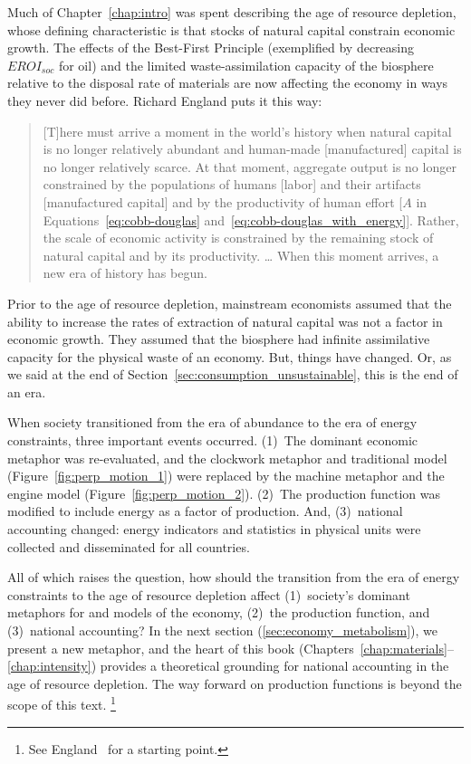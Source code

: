 Much of Chapter~\ref{chap:intro} was spent
describing the age of resource depletion,
whose defining characteristic
is that stocks of natural capital constrain economic growth.
The effects of the Best-First Principle (exemplified by decreasing $EROI_{soc}$ for oil)
and the limited waste-assimilation capacity of the biosphere
relative to the disposal rate of materials
are now affecting the economy in ways they never did before.
Richard England puts it this way:
%
\begin{quote}
	[T]here must arrive a moment in the world's history 
	when natural capital is no longer relatively abundant and 
	human-made [manufactured] capital is no longer relatively scarce. 
	At that moment, aggregate output is no longer constrained 
	by the populations of humans [labor] and their artifacts [manufactured capital]
	and by the productivity of human effort [$A$ in 
	Equations~\ref{eq:cobb-douglas} and~\ref{eq:cobb-douglas_with_energy}]. 
	Rather, the scale of economic activity is constrained 
	by the remaining stock of natural capital and by its productivity. 
	\dots
	When this moment arrives, a new era of history has begun.\cite[p.~430]{England:2000aa}
\end{quote}
%
Prior to the age of resource depletion,
mainstream economists assumed that the ability to increase 
the rates of extraction of natural capital 
was not a factor in economic growth.
They assumed that the biosphere had infinite assimilative capacity
for the physical waste of an economy.
But, things have changed. 
Or, as we said at the end of Section~\ref{sec:consumption_unsustainable}, 
this is the end of an era.

When society transitioned from the era of abundance 
to the era of energy constraints,
three important events occurred.
(1)~The dominant economic metaphor was re-evaluated, and 
the clockwork metaphor and traditional model (Figure~\ref{fig:perp_motion_1})
were replaced by 
the machine metaphor and the engine model (Figure~\ref{fig:perp_motion_2}).
(2)~The production function was modified to include energy as a factor of production.
And, (3)~national accounting changed: energy indicators and statistics 
in physical units were collected and disseminated for all countries.

All of which raises the question, 
how should the transition 
from the era of energy constraints 
to the age of resource depletion affect 
(1)~society's dominant metaphors for and models of the economy,
(2)~the production function, and 
(3)~national accounting?
In the next section (\ref{sec:economy_metabolism}), we present a new metaphor, 
and the heart of this book (Chapters~\ref{chap:materials}--\ref{chap:intensity})
provides a theoretical grounding for national accounting in the age of resource depletion.
The way forward on production functions
is beyond the scope of this text.%
	\footnote{
	See England~\cite{England:2000aa}
	for a starting point.
	}


